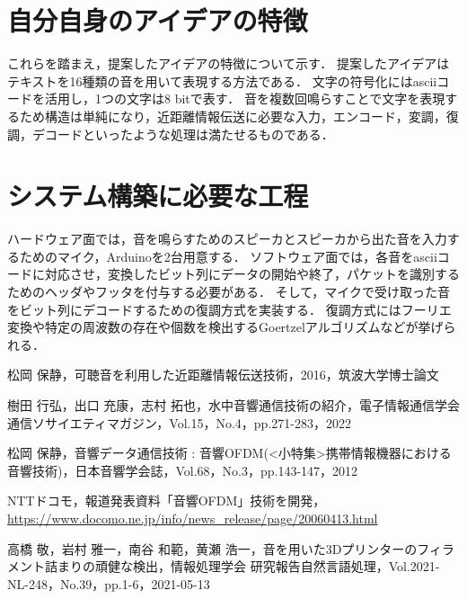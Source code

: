 \documentclass[a4paper,12pt,oneside]{jex}
\begin{document}
\section{自分自身のアイデアの特徴}
これらを踏まえ，提案したアイデアの特徴について示す．
提案したアイデアはテキストを16種類の音を用いて表現する方法である．
文字の符号化にはasciiコードを活用し，1つの文字は8 bitで表す．
音を複数回鳴らすことで文字を表現するため構造は単純になり，近距離情報伝送に必要な入力，エンコード，変調，復調，デコードといったような処理は満たせるものである．

\section{システム構築に必要な工程}
ハードウェア面では，音を鳴らすためのスピーカとスピーカから出た音を入力するためのマイク，Arduinoを2台用意する．
ソフトウェア面では，各音をasciiコードに対応させ，変換したビット列にデータの開始や終了，パケットを識別するためのヘッダやフッタを付与する必要がある．
そして，マイクで受け取った音をビット列にデコードするための復調方式を実装する．
復調方式にはフーリエ変換や特定の周波数の存在や個数を検出するGoertzelアルゴリズムなどが挙げられる\cite{ref:goertzel}．

\clearpage

\begin{thebibliography}{5}

  松岡 保静，可聴音を利用した近距離情報伝送技術，2016，筑波大学博士論文

  樹田 行弘，出口 充康，志村 拓也，水中音響通信技術の紹介，電子情報通信学会　通信ソサイエティマガジン，Vol.15，No.4，pp.271-283，2022

  松岡 保静，音響データ通信技術 : 音響OFDM(<小特集>携帯情報機器における音響技術)，日本音響学会誌，Vol.68，No.3，pp.143-147，2012

  NTTドコモ，報道発表資料「音響OFDM」技術を開発，\url{https://www.docomo.ne.jp/info/news_release/page/20060413.html}

  高橋 敬，岩村 雅一，南谷 和範，黄瀬 浩一，音を用いた3Dプリンターのフィラメント詰まりの頑健な検出，情報処理学会 研究報告自然言語処理，Vol.2021-NL-248，No.39，pp.1-6，2021-05-13
\end{thebibliography}
\end{document}
